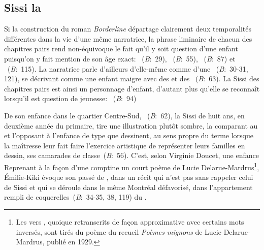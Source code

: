 \subsection{Sissi la }
Si la construction du roman \textit{Borderline} départage clairement deux temporalités différentes dans la vie d'une même narratrice, la phrase liminaire de chacun des chapitres pairs rend non-équivoque le fait qu'il y soit question d'une enfant puisqu'on y fait mention de son âge exact: ~(\textit{B}:~29), ~(\textit{B}:~55), ~(\textit{B}:~87) et ~(\textit{B}:~115).
La narratrice parle d'ailleurs d'elle-même comme d'une ~(\textit{B}:~30-31, 121), se décrivant comme une enfant maigre avec des  et des ~(\textit{B}:~63).
La Sissi des chapitres pairs est ainsi un personnage d'enfant, d'autant plus qu'elle se reconnaît lorsqu'il est question de jeunesse: ~(\textit{B}:~94)
\par
De son enfance dans le quartier Centre-Sud, ~(\textit{B}:~62), la Sissi de huit ans, en deuxième année du primaire, tire une illustration plutôt sombre, la comparant au  et l'opposant à l'enfance de type  que dessinent, au sens propre du terme lorsque la maîtresse leur fait faire l'exercice artistique de représenter leurs familles en dessin, ses camarades de classe~(\textit{B}:~56).
C'est, selon Virginie Doucet, une enfance 
Reprenant à la façon d'une comptine un court poème de Lucie Delarue-Mardrus\footnote{Les vers , quoique retranscrits de façon approximative avec certains mots inversés, sont tirés du poème  du recueil \textit{Poèmes mignons} de Lucie Delarue-Mardrus, publié en 1929.}, Émilie-Kiki évoque son passé de , dans un récit qui n'est pas sans rappeler celui de Sissi et qui se déroule dans le même Montréal défavorisé, dans l'appartement rempli de coquerelles~(\textit{B}:~34-35, 38, 119) du .
